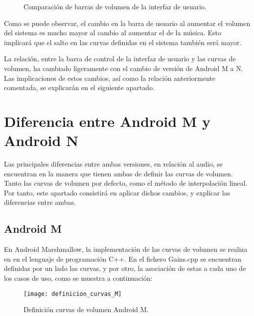 \begin{figure}[H]
	\centering
	\break
	\caption{Comparación de barras de volumen de la interfaz de usuario.} \label{fig:volume_compare_ui}
\end{figure}

Como se puede observar, el cambio en la barra de usuario al aumentar el volumen del sistema es mucho mayor al cambio al aumentar el de la música. Esto implicará que el salto en las curvas definidas en el sistema también será mayor.

La relación, entre la barra de control de la interfaz de usuario y las curvas de volumen, ha cambiado ligeramente con el cambio de versión de Android M a N. Las implicaciones de estos cambios, así como la relación anteriormente comentada, se explicarán en el siguiente apartado.

\section{Diferencia entre Android M y Android N}
Las principales diferencias entre ambas versiones, en relación al audio, se encuentran en la manera que tienen ambas de definir las curvas de volumen. Tanto las curvas de volumen por defecto, como el método de interpolación lineal. Por tanto, este apartado consistirá en aplicar dichos cambios, y explicar las diferencias entre ambas.

\subsection{Android M}
En Android Marshmallow, la implementación de las curvas de volumen se realiza en en el lenguaje de programación C++. En el fichero Gains.cpp se encuentran definidas por un lado las curvas, y por otro, la asociación de estas a cada uno de los casos de uso, como se muestra a continuación:

\begin{figure}[H]
		\centering
		\texttt{[image: definicion\_curvas\_M]}
		\caption{Definición curvas de volumen Android M.}
		\label{fig:declaracion_curvas_M}
\end{figure}

